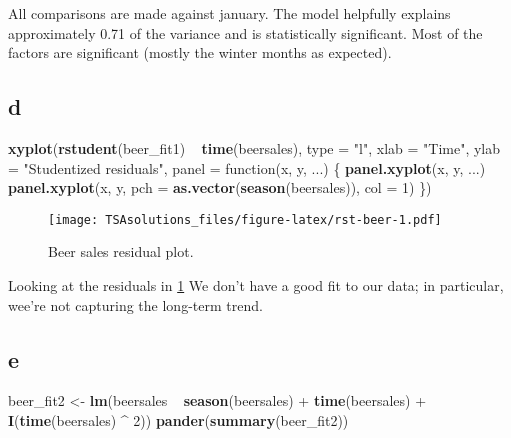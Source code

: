 \documentclass[]{book}
\newenvironment{Shaded}{\begin{snugshade}}{\end{snugshade}}
\newcommand{\KeywordTok}[1]{\textcolor[rgb]{0.13,0.29,0.53}{\textbf{{#1}}}}
\newcommand{\DataTypeTok}[1]{\textcolor[rgb]{0.13,0.29,0.53}{{#1}}}
\newcommand{\DecValTok}[1]{\textcolor[rgb]{0.00,0.00,0.81}{{#1}}}
\newcommand{\StringTok}[1]{\textcolor[rgb]{0.31,0.60,0.02}{{#1}}}
\newcommand{\NormalTok}[1]{{#1}}
\theoremstyle{definition}
\theoremstyle{definition}
\theoremstyle{remark}
\begin{document}
All comparisons are made against january. The model helpfully explains
approximately 0.71 of the variance and is statistically significant.
Most of the factors are significant (mostly the winter months as
expected).

\subsection*{d}\label{d-3}

\begin{Shaded}
\begin{Highlighting}[]
\KeywordTok{xyplot}\NormalTok{(}\KeywordTok{rstudent}\NormalTok{(beer_fit1) ~}\StringTok{ }\KeywordTok{time}\NormalTok{(beersales), }\DataTypeTok{type =} \StringTok{"l"}\NormalTok{,}
       \DataTypeTok{xlab =} \StringTok{"Time"}\NormalTok{, }\DataTypeTok{ylab =} \StringTok{"Studentized residuals"}\NormalTok{,}
       \DataTypeTok{panel =} \NormalTok{function(x, y, ...) \{}
         \KeywordTok{panel.xyplot}\NormalTok{(x, y, ...)}
         \KeywordTok{panel.xyplot}\NormalTok{(x, y, }\DataTypeTok{pch =} \KeywordTok{as.vector}\NormalTok{(}\KeywordTok{season}\NormalTok{(beersales)), }\DataTypeTok{col =} \DecValTok{1}\NormalTok{)}
       \NormalTok{\})}
\end{Highlighting}
\end{Shaded}

\begin{figure}[htbp]
\centering
\texttt{[image: TSAsolutions\_files/figure-latex/rst-beer-1.pdf]}
\caption{\label{fig:rst-beer}Beer sales residual plot.}
\end{figure}

Looking at the residuals in \ref{fig:rst-beer} We don't have a good fit
to our data; in particular, wee're not capturing the long-term trend.

\subsection*{e}\label{e-2}

\begin{Shaded}
\begin{Highlighting}[]
\NormalTok{beer_fit2 <-}\StringTok{ }\KeywordTok{lm}\NormalTok{(beersales ~}\StringTok{ }\KeywordTok{season}\NormalTok{(beersales) +}\StringTok{ }\KeywordTok{time}\NormalTok{(beersales) +}
\StringTok{                  }\KeywordTok{I}\NormalTok{(}\KeywordTok{time}\NormalTok{(beersales) ^}\StringTok{ }\DecValTok{2}\NormalTok{))}
\KeywordTok{pander}\NormalTok{(}\KeywordTok{summary}\NormalTok{(beer_fit2))}
\end{Highlighting}
\end{Shaded}
\end{document}
